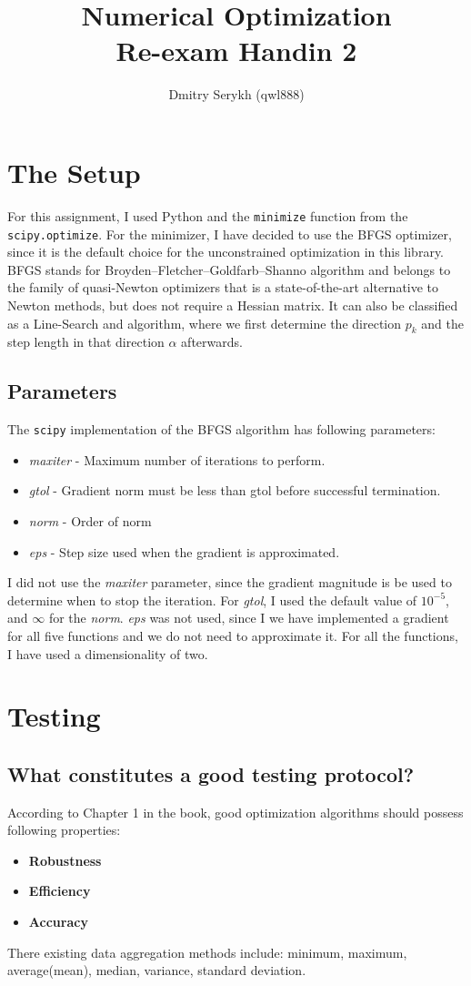 \documentclass[a4paper]{article}
\title{\vspace{-5cm} Numerical Optimization \\ Re-exam Handin 2}
\author{Dmitry Serykh (qwl888)}
\begin{document}
\maketitle
\section{The Setup}
For this assignment, I used Python and the \texttt{minimize} function from the
\texttt{scipy.optimize}. For the minimizer, I have decided to use the BFGS optimizer, since
it is the default choice for the unconstrained optimization in this library. BFGS stands for
Broyden–Fletcher–Goldfarb–Shanno algorithm and belongs to the family
of quasi-Newton optimizers that is a state-of-the-art alternative to Newton methods, but does
not require a Hessian matrix. It can also be classified as a Line-Search and
algorithm, where we first determine the direction $p_k$ and the step length
in that direction $\alpha$ afterwards.

\subsection{Parameters}
The \texttt{scipy} implementation of the BFGS algorithm has following
parameters:

\begin{itemize}
\item \emph{maxiter} - Maximum number of iterations to perform.
\item \emph{gtol} - Gradient norm must be less than gtol before successful termination.
\item \emph{norm} - Order of norm
\item \emph{eps} - Step size used when the gradient is approximated.
\end{itemize}
I did not use the \emph{maxiter} parameter, since the gradient magnitude is be used to determine 
when to stop the iteration. For \emph{gtol}, I used the default value of $10^{-5}$, and $\infty$ for
the \emph{norm}. \emph{eps} was not used, since I we have implemented a gradient
for all five functions and we do not need to approximate it.
For all the functions, I have used a dimensionality of two.

\section{Testing}
\subsection{What constitutes a good testing protocol?}
According to Chapter 1 in the book, good optimization algorithms should possess
following properties:
\begin{itemize}
\item \textbf{Robustness}
\item \textbf{Efficiency}
\item \textbf{Accuracy}
\end{itemize}
There existing data aggregation methods include: minimum, maximum,
average(mean), median, variance, standard deviation.
\end{document}
